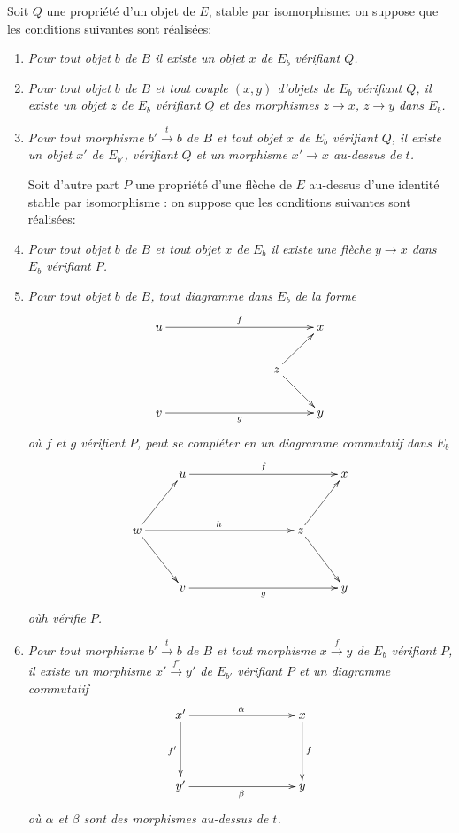 \documentclass[10pt]{../fichiers-configuration-latex/smfart}
\begin{document}
Soit $Q$ une propriété d'un objet de $E$, stable par isomorphisme: on
suppose que les conditions suivantes sont réalisées:
\begin{enumerate}
\renewcommand{\theenumi}{\alph{enumi}}
\renewcommand{\labelenumi}{\theenumi)}
\item \emph{Pour tout objet $b$ de $B$ il existe un objet $x$ de $E_b$
  vérifiant $Q$.}

\item \emph{Pour tout objet $b$ de $B$ et tout couple $(x, y)$ d'objets de
  $E_b$ vérifiant $Q$, il existe un objet $z$ de $E_b$ vérifiant $Q$
  et des morphismes $z \to x$, $z \to y$ dans $E_b$.}

\item \emph{Pour tout morphisme $b'\xrightarrow{t} b$ de $B$ et tout objet
  $x$ de $E_b$ vérifiant $Q$, il existe un objet $x'$ de $E_{b'}$,
  vérifiant $Q$ et un morphisme $x'\to x$ au-dessus de $t$.}

Soit d'autre part $P$ une propriété d'une flèche de $E$ au-dessus
d'une identité stable par isomorphisme : on suppose que les conditions
suivantes sont réalisées:

\item \emph{Pour tout objet $b$ de $B$ et tout objet $x$ de $E_b$ il existe
  une flèche $y \to x$ dans $E_b$ vérifiant $P$.}

\item \emph{Pour tout objet $b$ de $B$, tout diagramme dans $E_b$ de la
  forme}
\[
\xymatrix{
u \ar[rrrr]^{f} & & &                 &x\\
                & & &z\ar[ru]\ar[rd] &\\
v \ar[rrrr]_{g} & & &               & y
}
\]
\emph{où $f$ et $g$ vérifient $P$, peut se compléter en un diagramme
commutatif dans $E_b$}
\[
\xymatrix@R=1.25cm{
  & u\ar[rrrr]^{f} & & &  & x\\
w\ar[rrrr]^{h}\ar[ru]\ar[rd] &   & & &z\ar[ru]\ar[rd] & \\
  & v\ar[rrrr]_{g} & & &  & y
}
\]
\emph{où}\pageoriginale $h$ \emph{vérifie $P$.}

\item \emph{Pour tout morphisme $b' \xrightarrow{t} b$ de $B$ et tout
  morphisme $x \xrightarrow{f} y$ de $E_b$ vérifiant $P$, il existe un
  morphisme $x' \xrightarrow{f'} y'$ de $E_{b'}$ vérifiant $P$ et un
  diagramme commutatif}
\[
\xymatrix@C=3cm@R=1.5cm{
x' \ar[r]^{\alpha} \ar[d]_{f'}& x\ar[d]^{f}\\
y' \ar[r]_{\beta}& y
}
\]
\emph{où $\alpha$ et $\beta$ sont des morphismes au-dessus de $t$.}
\end{enumerate}
\end{document}
